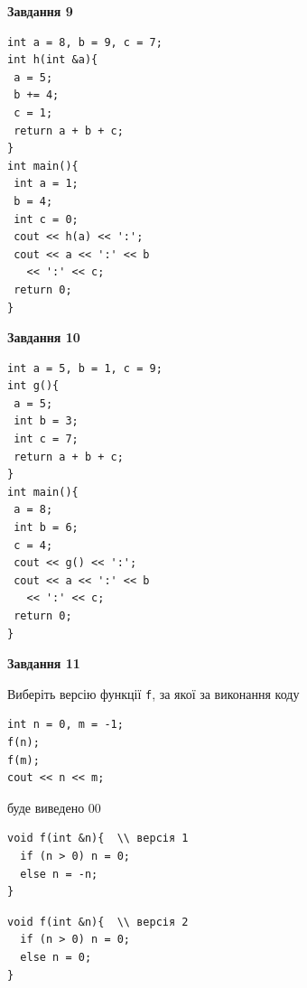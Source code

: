 \documentclass[12pt, ukrainian]{article}
\def\code#1{\Verb!#1!}
\begin{document}
{\begin {large}
\begin{minipage}[t]{11.0cm}
\end{minipage}


\begin{minipage}[t]{7.0cm}

\begin{center}
\textbf{Завдання 9}
\end{center}
\vspace{-8mm}

\begin{verbatim}
int a = 8, b = 9, c = 7;
int h(int &a){
 a = 5;
 b += 4;
 c = 1;
 return a + b + c;
}
int main(){
 int a = 1;
 b = 4;
 int c = 0;
 cout << h(a) << ':';
 cout << a << ':' << b 
   << ':' << c;
 return 0;
}
\end{verbatim}



\begin{center}
\textbf{Завдання 10}
\end{center}
\vspace{-8mm}

\begin{verbatim}
int a = 5, b = 1, c = 9;
int g(){
 a = 5;
 int b = 3;
 int c = 7;
 return a + b + c;
}
int main(){
 a = 8;
 int b = 6;
 c = 4;
 cout << g() << ':';
 cout << a << ':' << b 
   << ':' << c;
 return 0;
}
\end{verbatim}

\end{minipage}
\vline \hspace{1mm}
\begin{minipage}[t]{11.0cm}

\begin{center}
\textbf{Завдання 11}
\end{center}
Виберіть версію функції \code{f}, за якої за виконання коду
\begin{verbatim}
int n = 0, m = -1;
f(n);
f(m);
cout << n << m;
\end{verbatim}

буде виведено 00

\begin{verbatim}
void f(int &n){  \\ версія 1
  if (n > 0) n = 0;
  else n = -n;
}
\end{verbatim}

\vspace{-8mm}\begin{verbatim}
void f(int &n){  \\ версія 2
  if (n > 0) n = 0;
  else n = 0;
}
\end{verbatim}


\end{minipage}
\end{large}}
\end{document}
